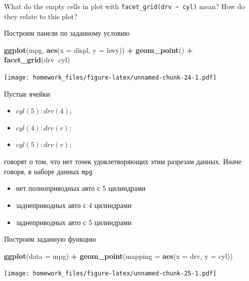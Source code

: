 \documentclass[]{book}
\newenvironment{Shaded}{\begin{snugshade}}{\end{snugshade}}
\newcommand{\KeywordTok}[1]{\textcolor[rgb]{0.13,0.29,0.53}{\textbf{#1}}}
\newcommand{\DataTypeTok}[1]{\textcolor[rgb]{0.13,0.29,0.53}{#1}}
\newcommand{\StringTok}[1]{\textcolor[rgb]{0.31,0.60,0.02}{#1}}
\newcommand{\OperatorTok}[1]{\textcolor[rgb]{0.81,0.36,0.00}{\textbf{#1}}}
\newcommand{\NormalTok}[1]{#1}
\providecommand{\tightlist}{%
  \setlength{\itemsep}{0pt}\setlength{\parskip}{0pt}}
\begin{document}
What do the empty cells in plot with
\texttt{facet\_grid(drv\ \textasciitilde{}\ cyl)} mean? How do they
relate to this plot?

Построим панели по заданному условию

\begin{Shaded}
\begin{Highlighting}[]
\KeywordTok{ggplot}\NormalTok{(mpg, }\KeywordTok{aes}\NormalTok{(}\DataTypeTok{x =}\NormalTok{ displ, }\DataTypeTok{y =}\NormalTok{ hwy)) }\OperatorTok{+}
\StringTok{    }\KeywordTok{geom_point}\NormalTok{() }\OperatorTok{+}
\StringTok{    }\KeywordTok{facet_grid}\NormalTok{(drv}\OperatorTok{~}\NormalTok{cyl)}
\end{Highlighting}
\end{Shaded}

\texttt{[image: homework\_files/figure-latex/unnamed-chunk-24-1.pdf]}

Пустые ячейки

\begin{itemize}
\tightlist
\item
  \(cyl(5):drv(4)\);
\item
  \(cyl(4):drv(r)\);
\item
  \(cyl(5):drv(r)\);
\end{itemize}

говорят о том, что нет точек удовлетворяющих этим разрезам данных. Иначе
говоря, в наборе данных \texttt{mpg}

\begin{itemize}
\tightlist
\item
  нет полноприводных авто с 5 цилиндрами
\item
  заднеприводных авто с 4 цилиндрами
\item
  заднеприводных авто с 5 цилиндрами
\end{itemize}

Построим заданную функцию

\begin{Shaded}
\begin{Highlighting}[]
\KeywordTok{ggplot}\NormalTok{(}\DataTypeTok{data =}\NormalTok{ mpg) }\OperatorTok{+}\StringTok{ }
\StringTok{  }\KeywordTok{geom_point}\NormalTok{(}\DataTypeTok{mapping =} \KeywordTok{aes}\NormalTok{(}\DataTypeTok{x =}\NormalTok{ drv, }\DataTypeTok{y =}\NormalTok{ cyl))}
\end{Highlighting}
\end{Shaded}

\texttt{[image: homework\_files/figure-latex/unnamed-chunk-25-1.pdf]}
\end{document}

